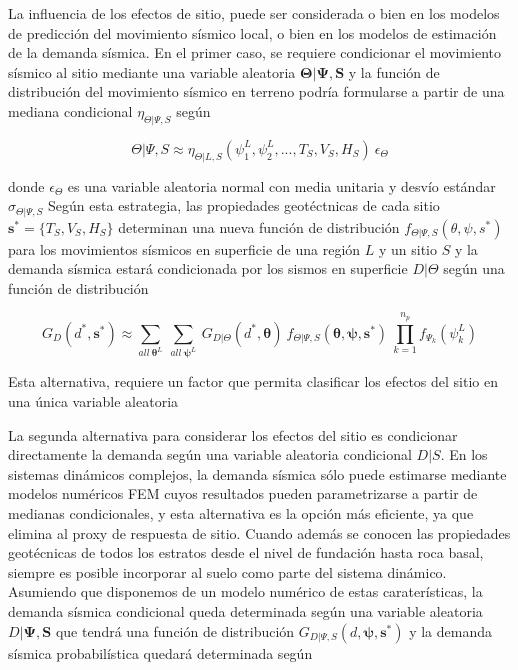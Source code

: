 \documentclass[
]{krantz}
\begin{document}
La influencia de los efectos de sitio, puede ser considerada o bien en los modelos de predicción del movimiento sísmico local, o bien en los modelos de estimación de la demanda sísmica. En el primer caso, se requiere condicionar el movimiento sísmico al sitio mediante una variable aleatoria \(\pmb\Theta|\pmb\Psi,\pmb S\) y la función de distribución del movimiento sísmico en terreno podría formularse a partir de una mediana condicional \(\eta_{\Theta|\Psi,S}\) según

\[ \begin{equation}
\Theta|\Psi,S \approx \eta_{\Theta|L,S}(\psi_1^{L},\psi_2^{L},...,T_S,V_S,H_S) \ \epsilon_{\Theta}
\end{equation}\]

donde \(\epsilon_{\Theta}\) es una variable aleatoria normal con media unitaria y desvío estándar \(\sigma_{\Theta|\Psi,S}\) Según esta estrategia, las propiedades geotéctnicas de cada sitio \(\pmb {s^*}=\{T_S,V_S,H_S\}\) determinan una nueva función de distribución \(f_{\Theta|{\Psi,S}}(\theta,\psi,s^*)\) para los movimientos sísmicos en superficie de una región \(L\) y un sitio \(S\) y la demanda sísmica estará condicionada por los sismos en superficie \(D|\Theta\) según una función de distribución

\[ \begin{equation} 
G_D(d^*,\pmb {s^*}) \approx \sum^{}_{all \ \pmb\theta^L} \ \sum^{}_{all \ \pmb\psi^L} \  G_{D|\Theta} \left( d^*,\pmb\theta \right ) \ f_{\Theta|\Psi,S}\left (\pmb\theta,\pmb\psi,\pmb {s^*}  \right ) \  \prod^{n_p}_{k=1}{f_{\Psi_k}(\psi_k^L)} 
\end{equation} \]

Esta alternativa, requiere un factor que permita clasificar los efectos del sitio en una única variable aleatoria

La segunda alternativa para considerar los efectos del sitio es condicionar directamente la demanda según una variable aleatoria condicional \(D|S\). En los sistemas dinámicos complejos, la demanda sísmica sólo puede estimarse mediante modelos numéricos FEM cuyos resultados pueden parametrizarse a partir de medianas condicionales, y esta alternativa es la opción más eficiente, ya que elimina al proxy de respuesta de sitio. Cuando además se conocen las propiedades geotécnicas de todos los estratos desde el nivel de fundación hasta roca basal, siempre es posible incorporar al suelo como parte del sistema dinámico. Asumiendo que disponemos de un modelo numérico de estas caraterísticas, la demanda sísmica condicional queda determinada según una variable aleatoria \(D|\pmb\Psi,\pmb S\) que tendrá una función de distribución \(G_{D|\Psi,S}(d,\pmb\psi,\pmb s^*)\) y la demanda sísmica probabilística quedará determinada según
\end{document}

